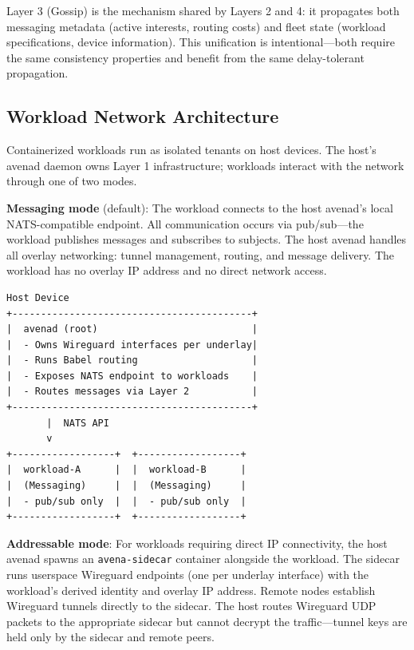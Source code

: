 Layer 3 (Gossip) is the mechanism shared by Layers 2 and 4: it propagates both messaging metadata (active interests, routing costs) and fleet state (workload specifications, device information). This unification is intentional---both require the same consistency properties and benefit from the same delay-tolerant propagation.

\subsection{Workload Network Architecture}

Containerized workloads run as isolated tenants on host devices. The host's avenad daemon owns Layer 1 infrastructure; workloads interact with the network through one of two modes.

\textbf{Messaging mode} (default): The workload connects to the host avenad's local NATS-compatible endpoint. All communication occurs via pub/sub---the workload publishes messages and subscribes to subjects. The host avenad handles all overlay networking: tunnel management, routing, and message delivery. The workload has no overlay IP address and no direct network access.

\begin{Verbatim}[frame=single,fontsize=\small]
Host Device
+------------------------------------------+
|  avenad (root)                           |
|  - Owns Wireguard interfaces per underlay|
|  - Runs Babel routing                    |
|  - Exposes NATS endpoint to workloads    |
|  - Routes messages via Layer 2           |
+------------------------------------------+
       |  NATS API
       v
+------------------+  +------------------+
|  workload-A      |  |  workload-B      |
|  (Messaging)     |  |  (Messaging)     |
|  - pub/sub only  |  |  - pub/sub only  |
+------------------+  +------------------+
\end{Verbatim}

\textbf{Addressable mode}: For workloads requiring direct IP connectivity, the host avenad spawns an \texttt{avena-sidecar} container alongside the workload. The sidecar runs userspace Wireguard endpoints (one per underlay interface) with the workload's derived identity and overlay IP address. Remote nodes establish Wireguard tunnels directly to the sidecar. The host routes Wireguard UDP packets to the appropriate sidecar but cannot decrypt the traffic---tunnel keys are held only by the sidecar and remote peers.

